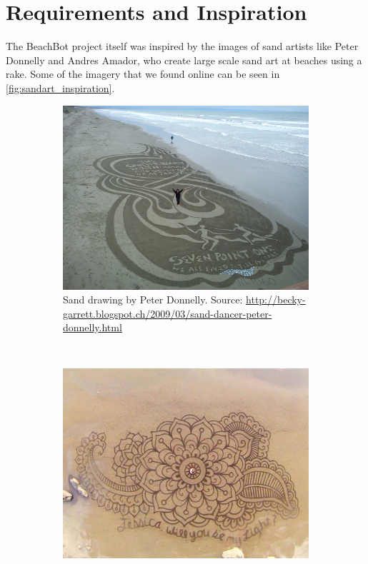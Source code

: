 \chapter{Requirements and Inspiration}

The BeachBot project itself was inspired by the images of sand artists like Peter Donnelly and Andres Amador, who create large scale sand art at beaches using a rake. Some of the imagery that we found online can be seen in \autoref{fig:sandart_inspiration}.

\begin{figure}
\centering
\begin{subfigure}[c]{1\textwidth}
\includegraphics[width=\textwidth]{images/requirements_inspiration/donnelly_1.jpg} 
\caption{Sand drawing by Peter Donnelly. Source: \url{http://becky-garrett.blogspot.ch/2009/03/sand-dancer-peter-donnelly.html}}
\end{subfigure}
\\
\begin{subfigure}[b]{0.46\textwidth}
\includegraphics[width=\textwidth]{images/requirements_inspiration/andres_armador_1.jpg} 

\end{subfigure}
\end{figure}
